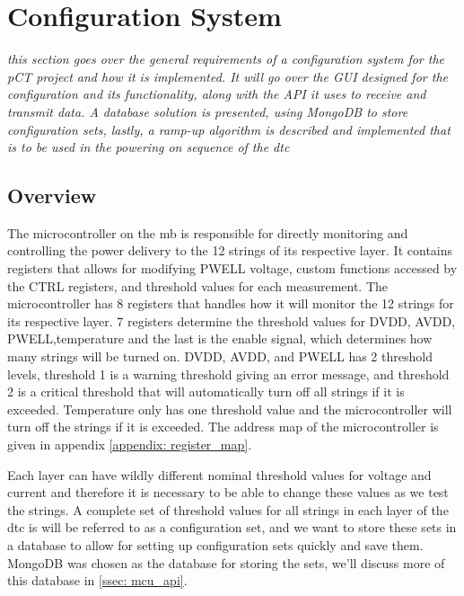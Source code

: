 \documentclass[main.tex]{subfiles}
\begin{document}
\section{Configuration System}
\label{section: configuration}
\textit{this section goes over the general requirements of a configuration system for the pCT project and how it is implemented. It will go over the GUI designed for the configuration and its functionality, along with the API it uses to receive and transmit data. A database solution is presented, using MongoDB to store configuration sets, lastly, a ramp-up algorithm is described and implemented that is to be used in the powering on sequence of the \gls{dtc} }





\subsection{Overview}
The microcontroller on the \gls{mb} is responsible for directly monitoring and controlling the power delivery to the 12 strings of its respective layer. It contains registers that allows for modifying PWELL voltage, custom functions accessed by the CTRL registers, and threshold values for each measurement. The microcontroller has 8 registers that handles how it will monitor the 12 strings for its respective layer.  7 registers determine the threshold values for DVDD, AVDD, PWELL,temperature and the last is the enable signal, which determines how many strings will be turned on. DVDD, AVDD, and PWELL has 2 threshold levels, threshold 1 is a warning threshold giving an error message, and threshold 2 is a critical threshold that will automatically turn off all strings if it is exceeded. Temperature only has one threshold value and the microcontroller will turn off the strings if it is exceeded. The address map of the microcontroller is given in appendix \ref{appendix: register_map}.

Each layer can have wildly different nominal threshold values for voltage and current and therefore it is necessary to be able to change these values as we test the strings. A complete set of threshold values for all strings in each layer of the \gls{dtc} is will be referred to as a configuration set, and we want to store these sets in a database to allow for setting up configuration sets quickly and save them. MongoDB was chosen as the database for storing the sets, we'll discuss more of this database in \autoref{ssec: mcu_api}.
\end{document}
